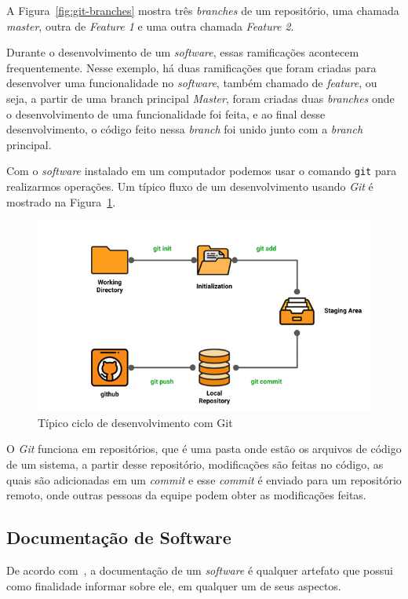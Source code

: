 \documentclass[12pt]{article}
\begin{document}
A Figura~\ref{fig:git-branches} mostra três \textit{branches} de um repositório,
uma chamada \textit{master}, outra de \textit{Feature 1} e uma outra chamada \textit{Feature 2}.

Durante o desenvolvimento de um \textit{software}, essas ramificações acontecem frequentemente. Nesse exemplo,
há duas ramificações que foram criadas para desenvolver uma funcionalidade no \textit{software}, também chamado de \textit{feature},
ou seja, a partir de uma branch principal \textit{Master}, foram criadas duas \textit{branches} onde o desenvolvimento
de uma funcionalidade foi feita, e ao final desse desenvolvimento, o código feito nessa \textit{branch} foi
unido junto com a \textit{branch} principal.

Com o \textit{software} instalado em um computador podemos usar o comando \verb|git| para realizarmos operações.
Um típico fluxo de um desenvolvimento usando \textit{Git} é mostrado na Figura~\ref{fig:git-lifecycle}.

\begin{figure}[H]
  \centering
  \includegraphics[width=.8\textwidth]{git/git-lifecycle.png}
  \caption{Típico ciclo de desenvolvimento com Git}\label{fig:git-lifecycle}
\end{figure}

O \textit{Git} funciona em repositórios, que é uma pasta onde estão os arquivos de código de um sistema,
a partir desse repositório, modificações são feitas no código, as quais são adicionadas em um \textit{commit}
e esse \textit{commit} é enviado para um repositório remoto, onde outras pessoas da equipe podem obter as modificações feitas.

\subsection{Documentação de Software}

De acordo com~\cite{Forward02softwaredocumentation}, a documentação de um \textit{software} é qualquer
artefato que possui como finalidade informar sobre ele, em qualquer um de seus aspectos.
\end{document}
